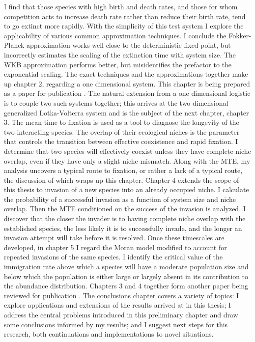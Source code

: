 I find that those species with high birth and death rates, and those for whom competition acts to increase death rate rather than reduce their birth rate, tend to go extinct more rapidly. %
With the simplicity of this test system I explore the applicability of various common approximation techniques. 
I conclude the Fokker-Planck approximation works well close to the deterministic fixed point, but incorrectly estimates the scaling of the extinction time with system size. The WKB approximation performs better, but misidentifies the prefactor to the exponential scaling. %
The exact techniques and the approximations together make up chapter 2, regarding a one dimensional system. 
This chapter is being prepared as a paper for publication \cite{Badali2019b}. 
The natural extension from a one dimensional logistic is to couple two such systems together; this arrives at the two dimensional generalized Lotka-Volterra system and is the subject of the next chapter, chapter 3. 
The mean time to fixation is used as a tool to diagnose the longevity of the two interacting species. 
The overlap of their ecological niches is the parameter that controls the transition between effective coexistence and rapid fixation. 
I determine that two species will effectively coexist unless they have complete niche overlap, even if they have only a slight niche mismatch. %
Along with the MTE, my analysis uncovers a typical route to fixation, or rather a lack of a typical route, the discussion of which wraps up this chapter. %
Chapter 4 extends the scope of this thesis to invasion of a new species into an already occupied niche. 
I calculate the probability of a successful invasion as a function of system size and niche overlap. 
Then the MTE conditioned on the success of the invasion is analyzed. 
I discover that the closer the invader is to having complete niche overlap with the established species, the less likely it is to successfully invade, and the longer an invasion attempt will take before it is resolved. %
Once these timescales are developed, in chapter 5 I regard the Moran model modified to account for repeated invasions of the same species. 
I identify the critical value of the immigration rate above which a species will have a moderate population size and below which the population is either large or largely absent in its contribution to the abundance distribution. %
Chapters 3 and 4 together form another paper being reviewed for publication \cite{Badali2019a}. 
The conclusions chapter covers a variety of topics: I explore applications and extensions of the results arrived at in this thesis; I address the central problems introduced in this preliminary chapter and draw some conclusions informed by my results; and I suggest next steps for this research, both continuations and implementations to novel situations. 
\fi

